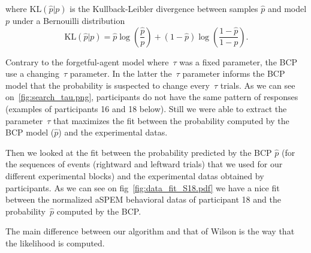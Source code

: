 \documentclass[profile,final,english, draft]{article}%
\newcommand{\KL}[2]{\text{KL}( #1 | #2 )}
\newcommand{\pa}[1]{\left( #1 \right)}
\begin{document}
where $\KL{\hat p}{p}$ is the Kullback-Leibler divergence between samples $\hat p$ and model $p$ under a Bernouilli distribution
\begin{equation}
\KL{\hat p}{p} = \hat{p} \log\pa{\frac{\hat p}{p}} + (1-\hat p) \log\pa{\frac{1-\hat p}{1-p}}.
\end{equation}


Contrary to the forgetful-agent model where~$\tau$ was a fixed parameter, the BCP use a changing~$\tau$ parameter. In the latter the~$\tau$ parameter informs the BCP model that the probability is suspected to change every~$\tau$ trials. As we can see on~\ref{fig:search_tau.png}, participants do not have the same pattern of responses (examples of participants 16 and 18 below). Still we were able to extract the parameter~$\tau$ that maximizes the fit between the probability computed by the BCP model ($\hat{p}$) and the experimental datas.


\hfill \break
 Then we looked at the fit between the probability predicted by the BCP $\hat{p}$ (for the sequences of events (rightward and leftward trials) that we used for our different experimental blocks) and the experimental datas obtained by participants. As we can see on fig~\ref{fig:data_fit_S18.pdf} we have a nice fit between the normalized aSPEM behavioral datas of participant 18 and the probability~$\hat{p}$ computed by the BCP.



The main difference between our algorithm and that of Wilson is the way that the likelihood is computed.
\end{document}
